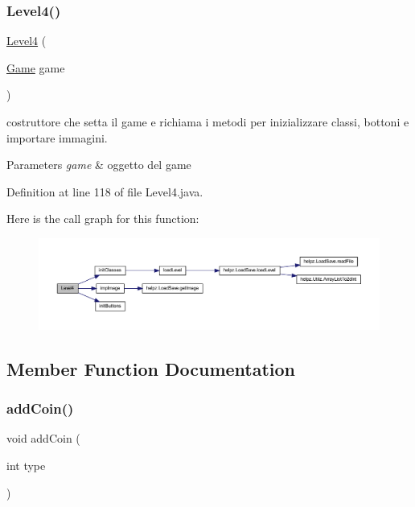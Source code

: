 \subsubsection{\texorpdfstring{Level4()}{Level4()}}
{\footnotesize\ttfamily \hyperlink{classscenes_1_1_level4}{Level4} (\begin{DoxyParamCaption}\item[{\hyperlink{classprogetto_1_1_game}{Game}}]{game }\end{DoxyParamCaption})}



costruttore che setta il game e richiama i metodi per inizializzare classi, bottoni e importare immagini. 


\begin{DoxyParams}{Parameters}
{\em game} & oggetto del game \\
\hline
\end{DoxyParams}


Definition at line 118 of file Level4.\+java.

Here is the call graph for this function\+:\nopagebreak
\begin{figure}[H]
\begin{center}
\leavevmode
\includegraphics[width=350pt]{classscenes_1_1_level4_ace3453f4ef6ea220bef6de5f957e89d5_cgraph}
\end{center}
\end{figure}


\subsection{Member Function Documentation}
\mbox{\label{classscenes_1_1_level4_a9f0f7dc28e596d2ebcd06e27ef05d9fd}} 
\subsubsection{\texorpdfstring{add\+Coin()}{addCoin()}}
{\footnotesize\ttfamily void add\+Coin (\begin{DoxyParamCaption}\item[{int}]{type }\end{DoxyParamCaption})}



